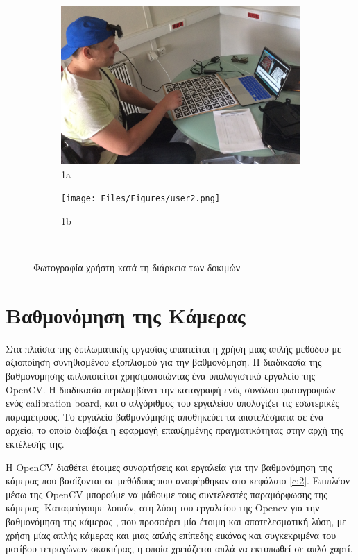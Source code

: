 \begin{figure}[H]
\begin{subfigure}{.5\textwidth}
  \centering
  \includegraphics[width=.8\linewidth]{Files/Figures/user1.png}
  \caption{1a}
  \label{fig:sfig1}
\end{subfigure}%
\begin{subfigure}{.5\textwidth}
  \centering
  \texttt{[image: Files/Figures/user2.png]}
  \caption{1b}
  \label{fig:sfig2}
\end{subfigure}\\
\caption{Φωτογραφία χρήστη κατά τη διάρκεια των δοκιμών}
\label{fig:test}
\end{figure}



\section{Βαθμονόμηση της Κάμερας}




Στα πλαίσια της διπλωματικής εργασίας απαιτείται η χρήση μιας απλής μεθόδου με αξιοποίηση συνηθισμένου εξοπλισμού για την βαθμονόμηση. Η διαδικασία της βαθμονόμησης απλοποιείται χρησιμοποιώντας ένα υπολογιστικό εργαλείο της OpenCV. 
Η διαδικασία περιλαμβάνει την καταγραφή ενός συνόλου φωτογραφιών ενός calibration board, και ο αλγόριθμος του εργαλείου υπολογίζει τις εσωτερικές παραμέτρους.
Το εργαλείο βαθμονόμησης αποθηκεύει τα αποτελέσματα σε ένα αρχείο, το οποίο διαβάζει η εφαρμογή επαυξημένης πραγματικότητας στην αρχή της εκτέλεσής της. 



Η OpenCV διαθέτει έτοιμες συναρτήσεις και εργαλεία για την βαθμονόμηση της κάμερας που βασίζονται σε μεθόδους που αναφέρθηκαν στο κεφάλαιο \ref{c:2}. Επιπλέον μέσω της OpenCV μπορούμε να μάθουμε τους συντελεστές παραμόρφωσης της κάμερας. 
Καταφεύγουμε λοιπόν, στη λύση του εργαλείου της Opencv για την βαθμονόμηση της κάμερας \cite{calibrationtool}, που προσφέρει μία έτοιμη και αποτελεσματική λύση, με χρήση μίας απλής κάμερας και μιας απλής επίπεδης εικόνας και συγκεκριμένα του μοτίβου τετραγώνων σκακιέρας, η οποία χρειάζεται απλά να εκτυπωθεί σε απλό χαρτί. 




